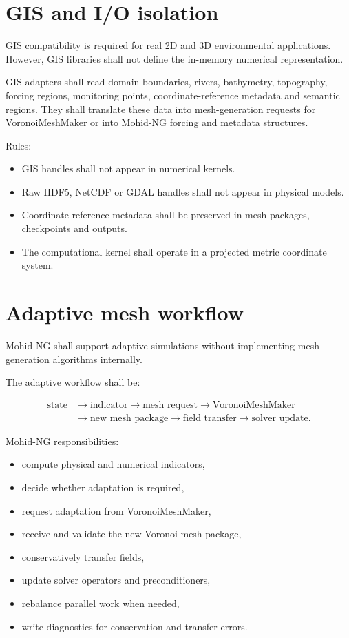 \documentclass[11pt,a4paper]{article}
\begin{document}
\section{GIS and I/O isolation}

GIS compatibility is required for real 2D and 3D environmental applications. However, GIS libraries shall not define the in-memory numerical representation.

GIS adapters shall read domain boundaries, rivers, bathymetry, topography, forcing regions, monitoring points, coordinate-reference metadata and semantic regions. They shall translate these data into mesh-generation requests for VoronoiMeshMaker or into Mohid-NG forcing and metadata structures.

Rules:

\begin{itemize}
  \item GIS handles shall not appear in numerical kernels.
  \item Raw HDF5, NetCDF or GDAL handles shall not appear in physical models.
  \item Coordinate-reference metadata shall be preserved in mesh packages, checkpoints and outputs.
  \item The computational kernel shall operate in a projected metric coordinate system.
\end{itemize}

\section{Adaptive mesh workflow}

Mohid-NG shall support adaptive simulations without implementing mesh-generation algorithms internally.

The adaptive workflow shall be:

\[
\begin{aligned}
\text{state} &\rightarrow \text{indicator}
\rightarrow \text{mesh request}
\rightarrow \text{VoronoiMeshMaker} \\
&\rightarrow \text{new mesh package}
\rightarrow \text{field transfer}
\rightarrow \text{solver update}.
\end{aligned}
\]

Mohid-NG responsibilities:

\begin{itemize}
  \item compute physical and numerical indicators,
  \item decide whether adaptation is required,
  \item request adaptation from VoronoiMeshMaker,
  \item receive and validate the new Voronoi mesh package,
  \item conservatively transfer fields,
  \item update solver operators and preconditioners,
  \item rebalance parallel work when needed,
  \item write diagnostics for conservation and transfer errors.
\end{itemize}
\end{document}
